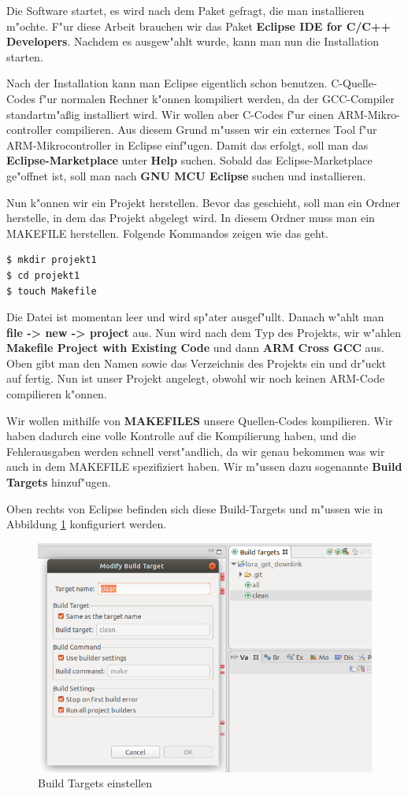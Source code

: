 Die Software startet, es wird nach dem Paket gefragt, die man 
installieren m"ochte. F"ur diese Arbeit brauchen wir das Paket 
\textbf{Eclipse IDE for C/C++ Developers}. Nachdem es ausgew"ahlt 
wurde, kann man nun die Installation starten.
  
Nach der Installation kann man Eclipse eigentlich schon benutzen. 
C-Quelle-Codes f"ur normalen Rechner k"onnen kompiliert werden, da der 
GCC-Compiler standartm"a\ss{}ig installiert wird. Wir wollen aber 
C-Codes f"ur einen ARM-Mikro- controller compilieren. Aus diesem Grund 
m"ussen wir ein externes Tool f"ur ARM-Mikrocontroller in Eclipse 
einf"ugen. Damit das erfolgt, soll man das 
\textbf{Eclipse-Marketplace} 
unter \textbf{Help} suchen. Sobald das Eclipse-Marketplace ge"offnet 
ist, soll man nach \textbf{GNU MCU Eclipse} suchen und 
installieren.

Nun k"onnen wir ein Projekt herstellen. Bevor das geschieht, soll man 
ein Ordner herstelle, in dem das Projekt abgelegt wird. In diesem 
Ordner muss man ein MAKEFILE herstellen. Folgende Kommandos zeigen wie 
das geht.
\begin{lstlisting}[frame=single]
$ mkdir projekt1
$ cd projekt1
$ touch Makefile
\end{lstlisting}
Die Datei ist momentan leer und wird sp"ater ausgef"ullt. Danach w"ahlt
man \textbf{file -> new -> project} aus. Nun wird nach dem Typ des 
Projekts, wir w"ahlen \textbf{Makefile Project with Existing Code} und 
dann \textbf{ARM Cross GCC} aus. Oben gibt man den Namen  sowie das
Verzeichnis des Projekts ein und dr"uckt auf fertig. Nun ist unser 
Projekt angelegt, obwohl wir noch keinen ARM-Code compilieren k"onnen.

Wir wollen mithilfe von \textbf{MAKEFILES} unsere Quellen-Codes 
kompilieren. Wir haben dadurch eine volle Kontrolle auf die 
Kompilierung haben, und die Fehlerausgaben werden schnell 
verst"andlich, da wir genau bekommen was wir auch in dem MAKEFILE 
spezifiziert haben. Wir m"ussen dazu sogenannte \textbf{Build Targets} 
hinzuf"ugen. 

Oben rechts von Eclipse befinden sich diese Build-Targets und m"ussen wie in Abbildung \ref{fig:build} konfiguriert werden.

\begin{figure}[h]
	\centering
	\includegraphics[width=13cm]{source/images/Build}
	\caption{Build Targets einstellen\label{fig:build}}
\end{figure}

